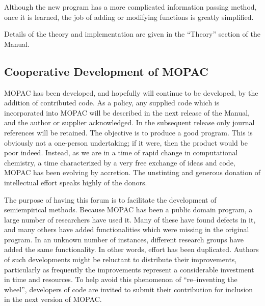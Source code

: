 Although the new program has a more complicated information passing method,
once it is learned, the job of adding or modifying functions is greatly
simplified.

Details of the theory and implementation are given in the ``Theory'' section
of the Manual.

\subsection{Cooperative Development of MOPAC}
MOPAC has been developed, and hopefully will continue
to be developed, by  the addition  of contributed code.    As a policy, any supplied code which is
incorporated into MOPAC will be described in  the  next  release  of  the
Manual,  and  the  author  or  supplier  acknowledged.   In the subsequent
release only journal references will be retained.  The  objective  is  to
produce  a good program.  This is obviously not a one-person undertaking; if it
were, then the product would be poor indeed.  Instead, as we are  in a  time
of rapid change in computational chemistry, a time characterized by a very free
exchange of ideas and code, MOPAC  has  been  evolving  by accretion.   The
unstinting and generous donation of intellectual effort speaks highly of the
donors.

The purpose of having this forum is to facilitate the development of
semiempirical methods.  Because MOPAC has been a public domain program, a large
number of researchers have used it.  Many of these have found defects in it,
and many others have added functionalities which were missing in the original
program.  In an unknown number of instances, different research groups have
added the same functionality. In other words, effort has been duplicated.
Authors of such developments might be reluctant to distribute their
improvements, particularly as frequently the improvements represent a
considerable investment in time and resources. To help avoid this phenomenon of
``re--inventing the wheel'', developers of code are invited to submit their
contribution for inclusion in the next version of MOPAC.

